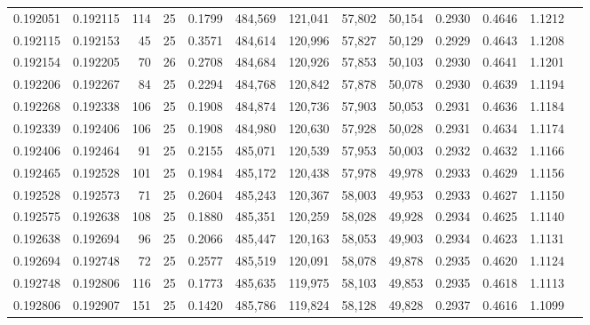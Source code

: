 \begin{tabular}{rrrrrrrrrrrrr}
0.192051 & 0.192115 &   114 &  25 &                                     0.1799 & 484,569 & 121,041 &  57,802 &  50,154 & 0.2930 & 0.4646 & 1.1212 \\
0.192115 & 0.192153 &    45 &  25 &                                     0.3571 & 484,614 & 120,996 &  57,827 &  50,129 & 0.2929 & 0.4643 & 1.1208 \\
0.192154 & 0.192205 &    70 &  26 &                                     0.2708 & 484,684 & 120,926 &  57,853 &  50,103 & 0.2930 & 0.4641 & 1.1201 \\
0.192206 & 0.192267 &    84 &  25 &                                     0.2294 & 484,768 & 120,842 &  57,878 &  50,078 & 0.2930 & 0.4639 & 1.1194 \\
0.192268 & 0.192338 &   106 &  25 &                                     0.1908 & 484,874 & 120,736 &  57,903 &  50,053 & 0.2931 & 0.4636 & 1.1184 \\
0.192339 & 0.192406 &   106 &  25 &                                     0.1908 & 484,980 & 120,630 &  57,928 &  50,028 & 0.2931 & 0.4634 & 1.1174 \\
0.192406 & 0.192464 &    91 &  25 &                                     0.2155 & 485,071 & 120,539 &  57,953 &  50,003 & 0.2932 & 0.4632 & 1.1166 \\
0.192465 & 0.192528 &   101 &  25 &                                     0.1984 & 485,172 & 120,438 &  57,978 &  49,978 & 0.2933 & 0.4629 & 1.1156 \\
0.192528 & 0.192573 &    71 &  25 &                                     0.2604 & 485,243 & 120,367 &  58,003 &  49,953 & 0.2933 & 0.4627 & 1.1150 \\
0.192575 & 0.192638 &   108 &  25 &                                     0.1880 & 485,351 & 120,259 &  58,028 &  49,928 & 0.2934 & 0.4625 & 1.1140 \\
0.192638 & 0.192694 &    96 &  25 &                                     0.2066 & 485,447 & 120,163 &  58,053 &  49,903 & 0.2934 & 0.4623 & 1.1131 \\
0.192694 & 0.192748 &    72 &  25 &                                     0.2577 & 485,519 & 120,091 &  58,078 &  49,878 & 0.2935 & 0.4620 & 1.1124 \\
0.192748 & 0.192806 &   116 &  25 &                                     0.1773 & 485,635 & 119,975 &  58,103 &  49,853 & 0.2935 & 0.4618 & 1.1113 \\
0.192806 & 0.192907 &   151 &  25 &                                     0.1420 & 485,786 & 119,824 &  58,128 &  49,828 & 0.2937 & 0.4616 & 1.1099 \\

\end{tabular}
